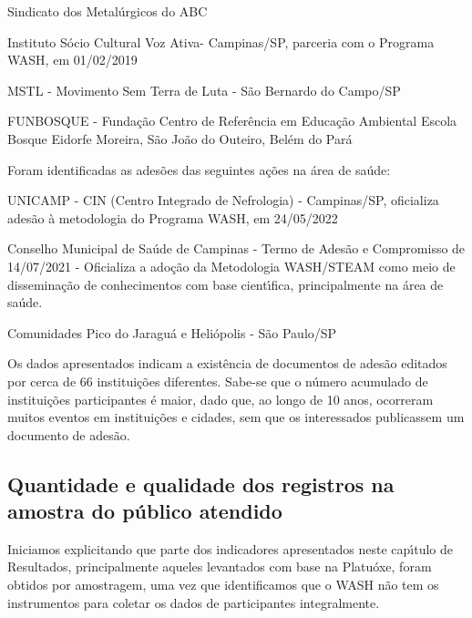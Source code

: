 \documentclass[
12pt,		%
openright,	%
twoside,  %
a4paper,			%
chapter=TITLE,		%
english,			%
french,				%
spanish,			%
brazil				%
]{USPSC-classe/USPSC}
\begin{document}
\begin{alineas}
\item Sindicato dos Metal\'urgicos do ABC
\item Instituto S\'ocio Cultural Voz Ativa- Campinas/SP,  parceria com o Programa WASH, em 01/02/2019
\item MSTL - Movimento Sem Terra de Luta - S\~ao Bernardo do Campo/SP
\item FUNBOSQUE - Funda\c{c}\~ao Centro de Refer\^encia em Educa\c{c}\~ao Ambiental Escola Bosque Eidorfe Moreira, S\~ao Jo\~ao do Outeiro, Bel\'em do Par\'a
\end{alineas}

Foram identificadas as ades\~oes das seguintes a\c{c}\~oes na \'area de sa\'ude:










\begin{alineas}
\item UNICAMP - CIN (Centro Integrado de Nefrologia) - Campinas/SP, oficializa ades\~ao \`a metodologia do Programa WASH, em 24/05/2022
\item Conselho Municipal de  Sa\'ude de Campinas - Termo de Ades\~ao e Compromisso de 14/07/2021 - Oficializa a ado\c{c}\~ao da Metodologia WASH/STEAM como meio de dissemina\c{c}\~ao de conhecimentos com base cient\'{\i}fica, principalmente na \'area de sa\'ude.
\item Comunidades Pico do Jaragu\'a e Heli\'opolis - S\~ao Paulo/SP
\end{alineas}

Os dados apresentados indicam a exist\^encia de documentos de ades\~ao editados por cerca de 66 institui\c{c}\~oes diferentes. Sabe-se que o n\'umero acumulado de institui\c{c}\~oes participantes \'e maior, dado que, ao longo de 10 anos, ocorreram muitos eventos em institui\c{c}\~oes e cidades, sem que os interessados publicassem um documento de ades\~ao.









\subsection[Quantidade e qualidade dos registros na amostra do p\'ublico atendido]{Quantidade e qualidade dos registros na amostra do p\'ublico atendido}\label{Quantidade e qualidade dos registros na amostra do p\'ublico atendido}
Iniciamos explicitando que parte dos indicadores apresentados neste cap\'{\i}tulo de Resultados, principalmente aqueles levantados com base na Platu\'oxe, foram obtidos por amostragem, uma vez que identificamos que o WASH n\~ao tem os instrumentos para coletar os dados de participantes integralmente.
\end{document}
